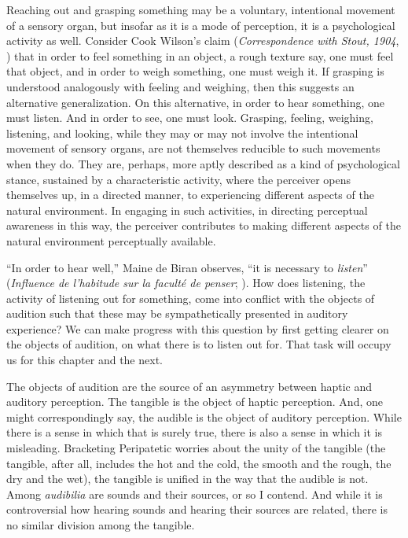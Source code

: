 Reaching out and grasping something may be a voluntary, intentional movement of a sensory organ, but insofar as it is a mode of perception, it is a psychological activity as well. Consider Cook Wilson's claim (\emph{Correspondence with Stout, 1904}, \citeyear{Cook-Wilson:1926sf}) that in order to feel something in an object, a rough texture say, one must feel that object, and in order to weigh something, one must weigh it. If grasping is understood analogously with feeling and weighing, then this suggests an alternative generalization. On this alternative, in order to hear something, one must listen. And in order to see, one must look. Grasping, feeling, weighing, listening, and looking, while they may or may not involve the intentional movement of sensory organs, are not themselves reducible to such movements when they do. They are, perhaps, more aptly described as a kind of psychological stance, sustained by a characteristic activity, where the perceiver opens themselves up, in a directed manner, to experiencing different aspects of the natural environment. In engaging in such activities, in directing perceptual awareness in this way, the perceiver contributes to making different aspects of the natural environment perceptually available.

``In order to hear well,'' Maine de Biran observes, ``it is necessary to \emph{listen}'' (\emph{Influence de l'habitude sur la faculté de penser}; \citealt[63--4]{Boehm:1929aa}). How does listening, the activity of listening out for something, come into conflict with the objects of audition such that these may be sympathetically presented in auditory experience? We can make progress with this question by first getting clearer on the objects of audition, on what there is to listen out for. That task will occupy us for this chapter and the next.

The objects of audition are the source of an asymmetry between haptic and auditory perception. The tangible is the object of haptic perception. And, one might correspondingly say, the audible is the object of auditory perception. While there is a sense in which that is surely true, there is also a sense in which it is misleading. Bracketing Peripatetic worries about the unity of the tangible (the tangible, after all, includes the hot and the cold, the smooth and the rough, the dry and the wet), the tangible is unified in the way that the audible is not. Among \emph{audibilia} are sounds and their sources, or so I contend. And while it is controversial how hearing sounds and hearing their sources are related, there is no similar division among the tangible.


